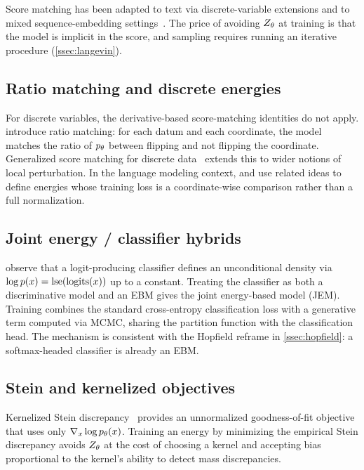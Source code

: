 Score matching has been adapted to text via discrete-variable extensions and to mixed sequence-embedding settings~\citep{meng2022concrete,lou2023discrete}.
The price of avoiding $Z_\theta$ at training is that the model is implicit in the score, and sampling requires running an iterative procedure (\cref{ssec:langevin}).

\subsection{Ratio matching and discrete energies}
\label{ssec:ratio_matching}

For discrete variables, the derivative-based score-matching identities do not apply.
\citet{hyvarinen2007some} introduce ratio matching: for each datum and each coordinate, the model matches the ratio of $p_\theta$ between flipping and not flipping the coordinate.
Generalized score matching for discrete data~\citep{lyu2009interpretation,grathwohl2021ono} extends this to wider notions of local perturbation.
In the language modeling context, \citet{deng2020residual} and \citet{lou2023discrete} use related ideas to define energies whose training loss is a coordinate-wise comparison rather than a full normalization.

\subsection{Joint energy / classifier hybrids}
\label{ssec:jem}

\citet{grathwohl2019your} observe that a logit-producing classifier defines an unconditional density via $\log p(x) = \mathrm{lse}(\mathrm{logits}(x))$ up to a constant.
Treating the classifier as both a discriminative model and an EBM gives the joint energy-based model (JEM).
Training combines the standard cross-entropy classification loss with a generative term computed via MCMC, sharing the partition function with the classification head.
The mechanism is consistent with the Hopfield reframe in \cref{ssec:hopfield}: a softmax-headed classifier is already an EBM.

\subsection{Stein and kernelized objectives}
\label{ssec:stein}

Kernelized Stein discrepancy~\citep{liu2016kernelized,chwialkowski2016kernel} provides an unnormalized goodness-of-fit objective that uses only $\nabla_x \log p_\theta(x)$.
Training an energy by minimizing the empirical Stein discrepancy avoids $Z_\theta$ at the cost of choosing a kernel and accepting bias proportional to the kernel's ability to detect mass discrepancies.

